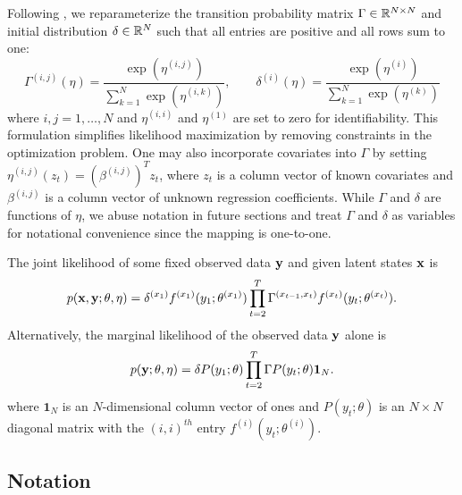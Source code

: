 Following \citet{Barajas:2017}, we reparameterize the transition probability matrix $\Gamma \in \mathbb{R}^{N \times N}$ and initial distribution $\delta \in \mathbb{R}^N$ such that all entries are positive and all rows sum to one:
%
\begin{equation}
    \Gamma^{(i,j)}(\eta) = \frac{\exp(\eta^{(i,j)})}{\sum_{k=1}^N \exp(\eta^{(i,k)})}, \qquad \delta^{(i)}(\eta) = \frac{\exp(\eta^{(i)})}{\sum_{k=1}^N \exp(\eta^{(k)})}
    \label{eqn:reparam}
\end{equation}
%
where $i,j = 1,\ldots,N$ and $\eta^{(i,i)}$ and $\eta^{(1)}$ are set to zero for identifiability. This formulation simplifies likelihood maximization by removing constraints in the optimization problem. One may also incorporate covariates into $\Gamma$ by setting $\eta^{(i,j)}(z_t) = \left(\beta^{(i,j)}\right)^T z_t$, where $z_t$ is a column vector of known covariates and $\beta^{(i,j)}$ is a column vector of unknown regression coefficients. While $\Gamma$ and $\delta$ are functions of $\eta$, we abuse notation in future sections and treat $\Gamma$ and $\delta$ as variables for notational convenience since the mapping is one-to-one.

The joint likelihood of some fixed observed data $\mathbf{y}$ and given latent states $\mathbf{x}$ is
%
\begin{equation}
    p(\mathbf{x},\mathbf{y};\theta,\eta) = \delta^{(x_1)} f^{(x_1)}(y_1; \theta^{(x_1)}) \prod_{t=2}^T \Gamma^{(x_{t-1},x_t)} f^{(x_t)}(y_t; \theta^{(x_t)}).
    \label{eqn:like}
\end{equation}
%
Alternatively, the marginal likelihood of the observed data $\mathbf{y}$ alone is 
%
\begin{equation}
    p(\mathbf{y};\theta,\eta) = \delta P(y_1;\theta) \prod_{t=2}^T \Gamma P(y_t;\theta) \mathbf{1}_N.
    \label{eqn:like_marginal}
\end{equation}
%
where $\mathbf{1}_N$ is an $N$-dimensional column vector of ones and $P(y_t;\theta)$ is an $N \times N$ diagonal matrix with the $(i,i)^{th}$ entry $f^{(i)}(y_t; \theta^{(i)})$.

\subsection{Notation}

